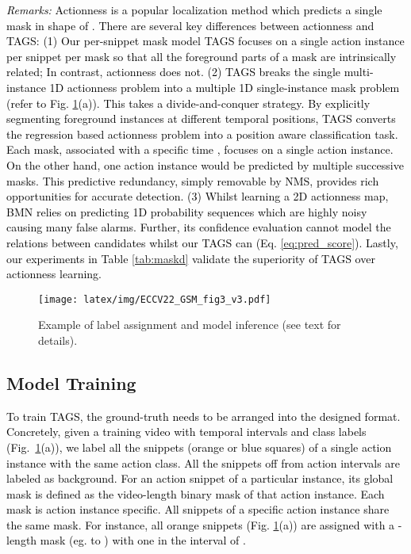 \documentclass[runningheads]{llncs}
\newcommand{\shortmodelname}{TAGS}
\begin{document}
\noindent\textcolor{black}{\noindent \textit{Remarks: } 
Actionness \cite{lin2019bmn,zhao2017temporal} is 
a popular localization method which predicts a single mask
in shape of .
There are several key differences between actionness and {\shortmodelname}: 
(1) Our per-snippet mask model
{\shortmodelname} focuses on a single action instance per snippet per mask
so that all the foreground parts of a mask
are intrinsically related; In contrast, actionness does not.
(2) {\shortmodelname} breaks the single multi-instance 1D actionness problem into a multiple 1D single-instance mask problem (refer to Fig. \ref{fig:label_infer}(a)).
This takes a divide-and-conquer strategy. 
By explicitly segmenting foreground instances at different temporal positions, {\shortmodelname} converts the regression based actionness problem into a position aware classification task. Each mask, associated with a specific time , focuses on a single action instance. 
On the other hand, one action instance would be predicted
by multiple successive masks.
This predictive redundancy, simply removable by NMS,
provides rich opportunities for accurate detection.
(3) Whilst learning a 2D actionness map,
BMN \cite{lin2019bmn} relies on predicting 1D probability sequences which are highly noisy causing many false alarms. Further, its confidence evaluation cannot model the relations between candidates whilst our {\shortmodelname} can (Eq. \eqref{eq:pred_score}).
Lastly, our experiments in Table \ref{tab:maskd} validate the superiority of {\shortmodelname} over actionness learning.
}





 \begin{figure}
\centering
    \texttt{[image: latex/img/ECCV22\_GSM\_fig3\_v3.pdf]}
\caption{Example of label assignment and model inference (see text for details).}
    \label{fig:label_infer}
\end{figure}

\subsection{Model Training}
\textcolor{black}{To train {\shortmodelname}, the ground-truth needs to be arranged into the designed format. Concretely, given a training video with temporal intervals and class labels (Fig.~\ref{fig:label_infer}(a)), we label all the snippets (orange or blue squares) of a single action instance with the same action class. All the snippets off from action intervals
are labeled as background. For an action snippet of a particular instance, its global mask is defined as the video-length
binary mask of that action instance. 
Each mask is action instance specific.
All snippets of a specific action instance share
the same mask. For instance, all orange snippets (Fig. \ref{fig:label_infer}(a)) are assigned with a -length mask (eg.  to ) with one in the interval of .
}
 
\end{document}
